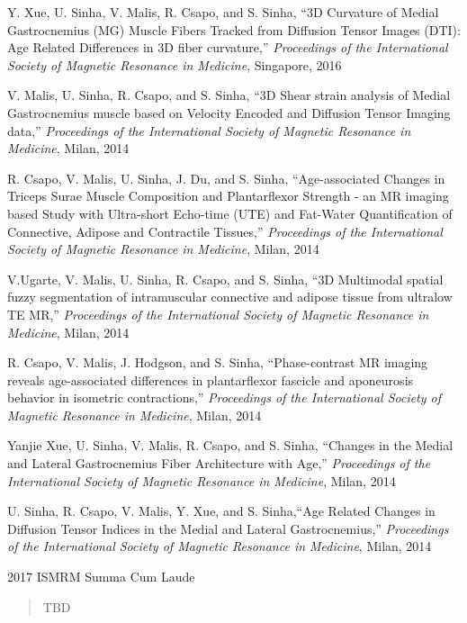 \begin{frontmatter}
\begin{vitapage}
\begin{talks}
	\item Y. Xue, U. Sinha, V. Malis, R. Csapo, and S. Sinha, ``3D Curvature of Medial Gastrocnemius (MG) Muscle Fibers Tracked from Diffusion Tensor Images (DTI): Age Related Differences in 3D fiber curvature,'' \emph{Proceedings of the International Society of Magnetic Resonance in Medicine}, Singapore, 2016
	\item V. Malis, U. Sinha, R. Csapo, and S. Sinha, ``3D Shear strain analysis of Medial Gastrocnemius muscle based on Velocity Encoded and Diffusion Tensor Imaging data,'' \emph{Proceedings of the International Society of Magnetic Resonance in Medicine}, Milan, 2014
	\item R. Csapo, V. Malis, U. Sinha, J. Du, and S. Sinha, ``Age-associated Changes in Triceps Surae Muscle Composition and Plantarflexor Strength - an MR imaging based Study with Ultra-short Echo-time (UTE) and Fat-Water Quantification of Connective, Adipose and Contractile Tissues,'' \emph{Proceedings of the International Society of Magnetic Resonance in Medicine}, Milan, 2014
	\item V.Ugarte, V. Malis, U. Sinha, R. Csapo, and S. Sinha, ``3D Multimodal spatial fuzzy segmentation of intramuscular connective and adipose tissue from ultralow TE MR,'' \emph{Proceedings of the International Society of Magnetic Resonance in Medicine}, Milan, 2014
	\item R. Csapo, V. Malis, J. Hodgson, and S. Sinha, ``Phase-contrast MR imaging reveals age-associated differences in plantarflexor fascicle and aponeurosis behavior in isometric contractions,'' \emph{Proceedings of the International Society of Magnetic Resonance in Medicine}, Milan, 2014
	\item Yanjie Xue, U. Sinha, V. Malis, R. Csapo, and S. Sinha, ``Changes in the Medial and Lateral Gastrocnemius Fiber Architecture with Age,'' \emph{Proceedings of the International Society of Magnetic Resonance in Medicine}, Milan, 2014
	\item U. Sinha, R. Csapo, V. Malis, Y. Xue, and S. Sinha,``Age Related Changes in Diffusion Tensor Indices in the Medial and Lateral Gastrocnemius,'' \emph{Proceedings of the International Society of Magnetic Resonance in Medicine}, Milan, 2014

\end{talks}

\begin{awards}
	\item 2017 ISMRM Summa Cum Laude	
\end{awards}


\end{vitapage}


%
%
\begin{abstract}
TBD
\end{abstract}


\end{frontmatter}
